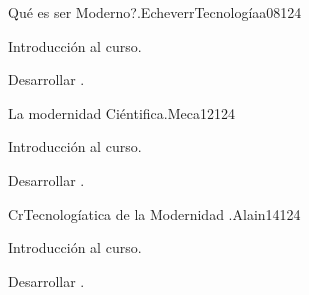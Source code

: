 \begin{syllabus}
\begin{unit}{Qué es ser Moderno?.}{}{EcheverrTecnologíaa08}{12}{4}
   \begin{topics}
      \item Introducción al curso.
   \end{topics}
   \begin{learningoutcomes}
      \item Desarrollar .
   \end{learningoutcomes}
\end{unit}

\begin{unit}{La modernidad Ciéntifica.}{}{Meca12}{12}{4}
   \begin{topics}
      \item Introducción al curso.
   \end{topics}
   \begin{learningoutcomes}
      \item Desarrollar .
   \end{learningoutcomes}
\end{unit}

\begin{unit}{CrTecnologíatica de la Modernidad  .}{}{Alain14}{12}{4}
   \begin{topics}
      \item Introducción al curso.
   \end{topics}
   \begin{learningoutcomes}
      \item Desarrollar .
   \end{learningoutcomes}
\end{unit}






\begin{coursebibliography}
\end{coursebibliography}

\end{syllabus}
